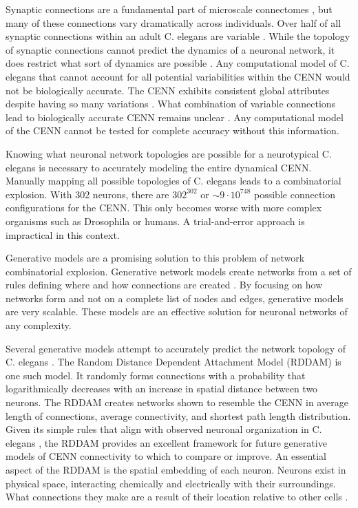 Synaptic connections are a fundamental part of microscale connectomes \citep{Sporns}, but many of these connections vary dramatically across individuals. 
Over half of all synaptic connections within an adult C. elegans are variable \citep{Witvliet}. 
While the topology of synaptic connections cannot predict the dynamics of a neuronal network, it does restrict what sort of dynamics are possible \citep{Prinz}. 
Any computational model of C. elegans that cannot account for all potential variabilities within the CENN would not be biologically accurate. 
The CENN exhibits consistent global attributes despite having so many variations \citep{PerezEscudero}. 
What combination of variable connections lead to biologically accurate CENN remains unclear \citep{Witvliet}. 
Any computational model of the CENN cannot be tested for complete accuracy without this information. 

Knowing what neuronal network topologies are possible for a neurotypical C. elegans is necessary to accurately modeling the entire dynamical CENN. 
Manually mapping all possible topologies of C. elegans leads to a combinatorial explosion. 
With 302 neurons, there are $302^{302}$ or $\sim 9 \cdot 10^{748}$ possible connection configurations for the CENN. 
This only becomes worse with more complex organisms such as Drosophila or humans. 
A trial-and-error approach is impractical in this context.

Generative models are a promising solution to this problem of network combinatorial explosion. Generative network models create networks from a set of rules defining where and how connections are created \citep{Betzel}. 
By focusing on how networks form and not on a complete list of nodes and edges, generative models are very scalable. 
These models are an effective solution for neuronal networks of any complexity. 

Several generative models attempt to accurately predict the network topology of C. elegans \citep{Costa,Itzhack,Khajezade,Nicosia}. 
The Random Distance Dependent Attachment Model (RDDAM) is one such model\citep{Itzhack}. 
It randomly forms connections with a probability that logarithmically decreases with an increase in spatial distance between two neurons. 
The RDDAM creates networks shown to resemble the CENN in average length of connections, average connectivity, and shortest path length distribution. 
Given its simple rules that align with observed neuronal organization in C. elegans \citep{PerezEscudero}, the RDDAM provides an excellent framework for future generative models of CENN connectivity to which to compare or improve. 
An essential aspect of the RDDAM is the spatial embedding of each neuron. 
Neurons exist in physical space, interacting chemically and electrically with their surroundings. What connections they make are a result of their location relative to other cells  \citep{Hentschel,Kaiser,PerezEscudero}. 

